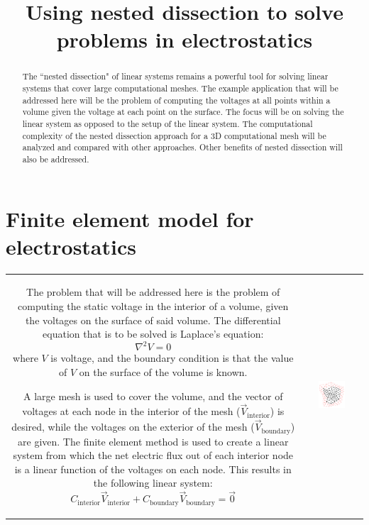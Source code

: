 \documentclass{article}
\title{Using nested dissection to solve problems in electrostatics}
\date{}
\begin{document}
\maketitle

\begin{abstract}
The ``nested dissection" of linear systems remains a powerful tool for solving linear systems that cover large computational meshes. The example application that will be addressed here will be the problem of computing the voltages at all points within a volume given the voltage at each point on the surface. The focus will be on solving the linear system as opposed to the setup of the linear system. The computational complexity of the nested dissection approach for a 3D computational mesh will be analyzed and compared with other approaches. Other benefits of nested dissection will also be addressed. 
\end{abstract}






\section{Finite element model for electrostatics} 

\begin{center}
\begin{tabular}{cc}
\parbox{0.5\textwidth}{
The problem that will be addressed here is the problem of computing the static voltage in the interior of a volume, given the voltages on the surface of said volume. The differential equation that is to be solved is Laplace's equation:
\[\nabla^2 V = 0\]
where \(V\) is voltage, and the boundary condition is that the value of \(V\) on the surface of the volume is known.

A large mesh is used to cover the volume, and the vector of voltages at each node in the interior of the mesh (\(\vec{V}_{\text{interior}}\)) is desired, while the voltages on the exterior of the mesh (\(\vec{V}_{\text{boundary}}\)) are given. The finite element method is used to create a linear system from which the net electric flux out of each interior node is a linear function of the voltages on each node. This results in the following linear system: 
\[C_{\text{interior}}\vec{V}_{\text{interior}} + C_{\text{boundary}}\vec{V}_{\text{boundary}} = \vec{0}\]
} & \parbox{0.5\textwidth}{
\includegraphics[width = 0.5\textwidth]{electrostatics_computational_mesh}
}
\end{tabular}
\end{center}
\end{document}
